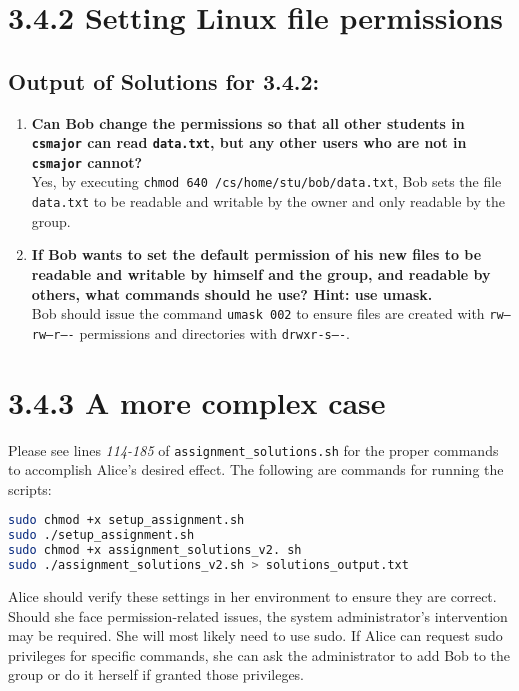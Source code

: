 \documentclass{article}
\begin{document}
\section*{3.4.2 Setting Linux file permissions}

\subsection*{Output of Solutions for 3.4.2:}


\begin{enumerate}
    \item \textbf{Can Bob change the permissions so that all other students in \texttt{csmajor} can read \texttt{data.txt}, but any other users who are not in \texttt{csmajor} cannot?}\\
    Yes, by executing \texttt{chmod 640 /cs/home/stu/bob/data.txt}, Bob sets the file \texttt{data.txt} to be readable and writable by the owner and only readable by the group.
    
    \item \textbf{If Bob wants to set the default permission of his new files to be readable and writable by himself and the group, and readable by others, what commands should he use? Hint: use umask.}\\
    Bob should issue the command \texttt{umask 002} to ensure files are created with \texttt{rw--rw--r----} permissions and directories with \texttt{drwxr-s----}.
\end{enumerate}

\section*{3.4.3 A more complex case}

Please see lines \textit{114-185} of \texttt{assignment\_solutions.sh} for the proper commands to accomplish Alice's desired effect. The following are commands for running the scripts: 

\begin{lstlisting}[language=bash]
sudo chmod +x setup_assignment.sh
sudo ./setup_assignment.sh
sudo chmod +x assignment_solutions_v2. sh
sudo ./assignment_solutions_v2.sh > solutions_output.txt
\end{lstlisting}

{\color{red}Alice should verify these settings in her environment to ensure they are correct. Should she face permission-related issues, the system administrator’s intervention may be required. She will most likely need to use sudo. If Alice can request sudo privileges for specific commands, she can ask the administrator to add Bob to the group or do it herself if granted those privileges. }
\end{document}

